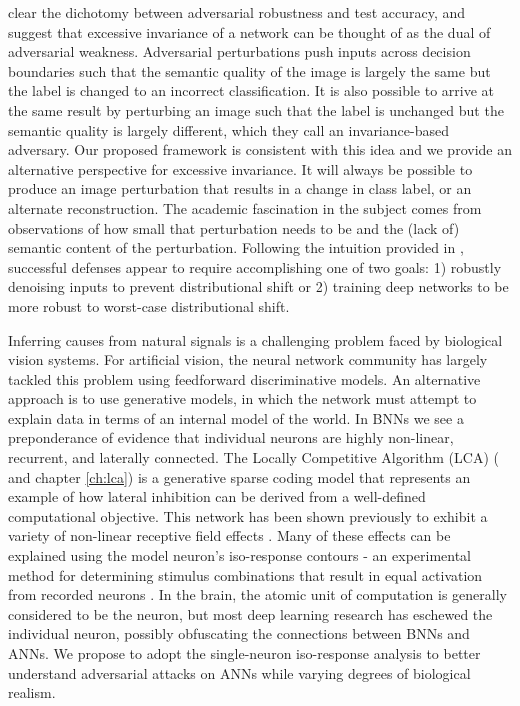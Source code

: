 clear the dichotomy between adversarial robustness and test accuracy, and suggest that excessive invariance of a network can  be thought of as the dual of adversarial weakness. Adversarial perturbations push inputs across decision boundaries such that the semantic quality of the image is largely the same but the label is changed to an incorrect classification. It is also possible to arrive at the same result by perturbing an image such that the label is unchanged but the semantic quality is largely different, which they call an invariance-based adversary. Our proposed framework is consistent with this idea and we provide an alternative perspective for excessive invariance. It will always be possible to produce an image perturbation that results in a change in class label, or an alternate reconstruction. The academic fascination in the subject comes from observations of how small that perturbation needs to be and the (lack of) semantic content of the perturbation. Following the intuition provided in \parencite{ford2019adversarial}, successful defenses appear to require accomplishing one of two goals: 1) robustly denoising inputs to prevent distributional shift or 2) training deep networks to be more robust to worst-case distributional shift.

Inferring causes from natural signals is a challenging problem faced by biological vision systems. For artificial vision, the neural network community has largely tackled this problem using feedforward discriminative models. An alternative approach is to use generative models, in which the network must attempt to explain data in terms of an internal model of the world. In BNNs we see a preponderance of evidence that individual neurons are highly non-linear, recurrent, and laterally connected. The Locally Competitive Algorithm (LCA) (\cite{rozell2008sparse} and chapter \ref{ch:lca}) is a generative sparse coding model that represents an example of how lateral inhibition can be derived from a well-defined computational objective. This network has been shown previously to exhibit a variety of non-linear receptive field effects \parencite{zhu2013visual}. Many of these effects can be explained using the model neuron’s iso-response contours - an experimental method for determining stimulus combinations that result in equal activation from recorded neurons \parencite{golden2016conjectures}. In the brain, the atomic unit of computation is generally considered to be the neuron, but most deep learning research has eschewed the individual neuron, possibly obfuscating the connections between BNNs and ANNs. We propose to adopt the single-neuron iso-response analysis to better understand adversarial attacks on ANNs while varying degrees of biological realism.

